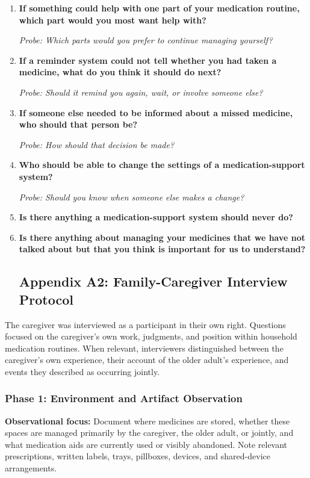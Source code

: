\begin{enumerate}[resume]
  \item \textbf{If something could help with one part of your medication routine, which part would you most want help with?}

  \textit{Probe: Which parts would you prefer to continue managing yourself?}
  \item \textbf{If a reminder system could not tell whether you had taken a medicine, what do you think it should do next?}

  \textit{Probe: Should it remind you again, wait, or involve someone else?}
  \item \textbf{If someone else needed to be informed about a missed medicine, who should that person be?}

  \textit{Probe: How should that decision be made?}
  \item \textbf{Who should be able to change the settings of a medication-support system?}

  \textit{Probe: Should you know when someone else makes a change?}
  \item \textbf{Is there anything a medication-support system should never do?}
  \item \textbf{Is there anything about managing your medicines that we have not talked about but that you think is important for us to understand?}
\subsection{Appendix A2: Family-Caregiver Interview Protocol}
\end{enumerate}


The caregiver was interviewed as a participant in their own right. Questions focused on the caregiver's own work, judgments, and position within household medication routines. When relevant, interviewers distinguished between the caregiver's own experience, their account of the older adult's experience, and events they described as occurring jointly.

\subsubsection{Phase 1: Environment and Artifact Observation}

\textbf{Observational focus:} Document where medicines are stored, whether these spaces are managed primarily by the caregiver, the older adult, or jointly, and what medication aids are currently used or visibly abandoned. Note relevant prescriptions, written labels, trays, pillboxes, devices, and shared-device arrangements.

